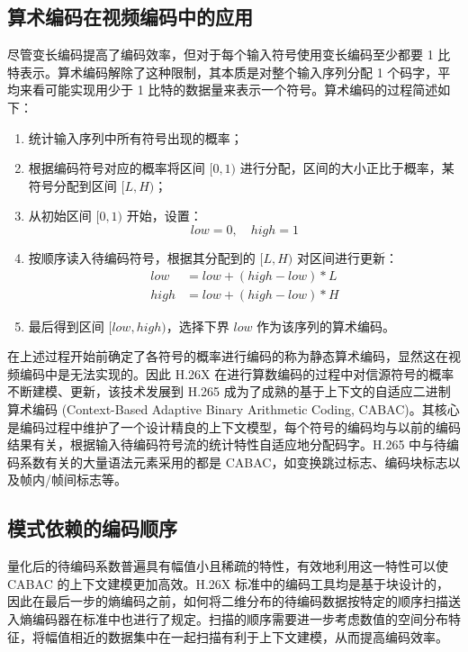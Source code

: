 \subsection{算术编码在视频编码中的应用}
尽管变长编码提高了编码效率，但对于每个输入符号使用变长编码至少都要 1 比特表示。算术编码解除了这种限制，其本质是对整个输入序列分配 1 个码字，平均来看可能实现用少于 1 比特的数据量来表示一个符号。算术编码的过程简述如下：
\begin{enumerate}
    \item 统计输入序列中所有符号出现的概率；
    \item 根据编码符号对应的概率将区间 $[0,1)$ 进行分配，区间的大小正比于概率，某符号分配到区间 $[L, H)$；
    \item 从初始区间 $[0,1)$ 开始，设置：
          \begin{equation}
              low=0, \quad high=1 \nonumber
          \end{equation}
    \item 按顺序读入待编码符号，根据其分配到的 $[L, H)$ 对区间进行更新：
          \begin{equation}
              \begin{aligned}
                  low  & =low+(high-low)*L \\
                  high & =low+(high-low)*H
              \end{aligned} \nonumber
          \end{equation}
    \item 最后得到区间 $[low, high)$，选择下界 $low$ 作为该序列的算术编码。
\end{enumerate}

在上述过程开始前确定了各符号的概率进行编码的称为静态算术编码，显然这在视频编码中是无法实现的。因此 H.26X 在进行算数编码的过程中对信源符号的概率不断建模、更新，该技术发展到 H.265 成为了成熟的基于上下文的自适应二进制算术编码 (Context-Based Adaptive Binary Arithmetic Coding, CABAC)。其核心是编码过程中维护了一个设计精良的上下文模型，每个符号的编码均与以前的编码结果有关，根据输入待编码符号流的统计特性自适应地分配码字。H.265 中与待编码系数有关的大量语法元素采用的都是 CABAC，如变换跳过标志、编码块标志以及帧内/帧间标志等。

\subsection{模式依赖的编码顺序}
量化后的待编码系数普遍具有幅值小且稀疏的特性，有效地利用这一特性可以使 CABAC 的上下文建模更加高效。H.26X 标准中的编码工具均是基于块设计的，因此在最后一步的熵编码之前，如何将二维分布的待编码数据按特定的顺序扫描送入熵编码器在标准中也进行了规定。扫描的顺序需要进一步考虑数值的空间分布特征，将幅值相近的数据集中在一起扫描有利于上下文建模，从而提高编码效率。

